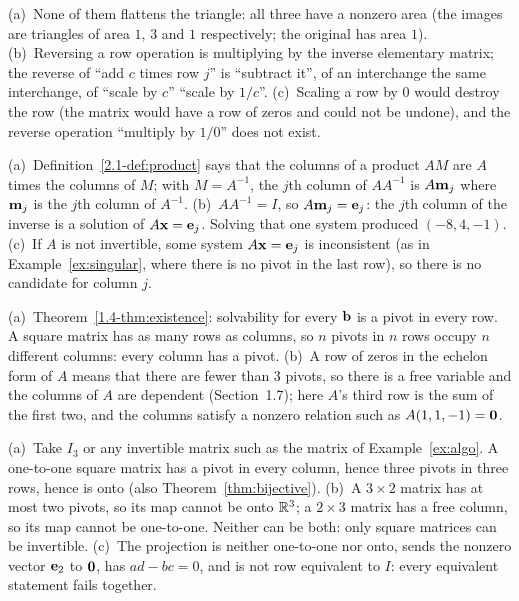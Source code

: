 \documentclass[11pt]{article}
\begin{document}
\begin{description}[leftmargin=0pt,itemsep=5pt]
  \item[Pause and think \ref{think:elemmaps}.] (a)~None of them flattens the triangle: all three have a nonzero area (the images are triangles of area $1$, $3$ and $1$ respectively; the original has area $1$). (b)~Reversing a row operation is multiplying by the inverse elementary matrix; the reverse of ``add $c$ times row $j$'' is ``subtract it'', of an interchange the same interchange, of ``scale by $c$'' ``scale by $1/c$''. (c)~Scaling a row by $0$ would destroy the row (the matrix would have a row of zeros and could not be undone), and the reverse operation ``multiply by $1/0$'' does not exist.
  \item[Pause and think \ref{think:colsinv}.] (a)~Definition~\ref{2.1-def:product} says that the columns of a product $AM$ are $A$ times the columns of $M$; with $M=A^{-1}$, the $j$th column of $AA^{-1}$ is $A\mathbf{m}_j$ where $\mathbf{m}_j$ is the $j$th column of $A^{-1}$. (b)~$AA^{-1}=I$, so $A\mathbf{m}_j=\mathbf{e}_j$: the $j$th column of the inverse is a solution of $A\mathbf{x}=\mathbf{e}_j$. Solving that one system produced $(-8,4,-1)$. (c)~If $A$ is not invertible, some system $A\mathbf{x}=\mathbf{e}_j$ is inconsistent (as in Example~\ref{ex:singular}, where there is no pivot in the last row), so there is no candidate for column $j$.
  \item[Pause and think \ref{think:twodesc}.] (a)~Theorem~\ref{1.4-thm:existence}: solvability for every $\mathbf{b}$ is a pivot in every row. A square matrix has as many rows as columns, so $n$ pivots in $n$ rows occupy $n$ different columns: every column has a pivot. (b)~A row of zeros in the echelon form of $A$ means that there are fewer than $3$ pivots, so there is a free variable and the columns of $A$ are dependent (Section~1.7); here $A$'s third row is the sum of the first two, and the columns satisfy a nonzero relation such as $A(1,1,-1)=\mathbf{0}$.
  \item[Pause and think \ref{think:whole}.] (a)~Take $I_3$ or any invertible matrix such as the matrix of Example~\ref{ex:algo}. A one-to-one square matrix has a pivot in every column, hence three pivots in three rows, hence is onto (also Theorem~\ref{thm:bijective}). (b)~A $3\times2$ matrix has at most two pivots, so its map cannot be onto $\mathbb{R}^3$; a $2\times3$ matrix has a free column, so its map cannot be one-to-one. Neither can be both: only square matrices can be invertible. (c)~The projection is neither one-to-one nor onto, sends the nonzero vector $\mathbf{e}_2$ to $\mathbf{0}$, has $ad-bc=0$, and is not row equivalent to $I$: every equivalent statement fails together.

\end{description}
\end{document}
